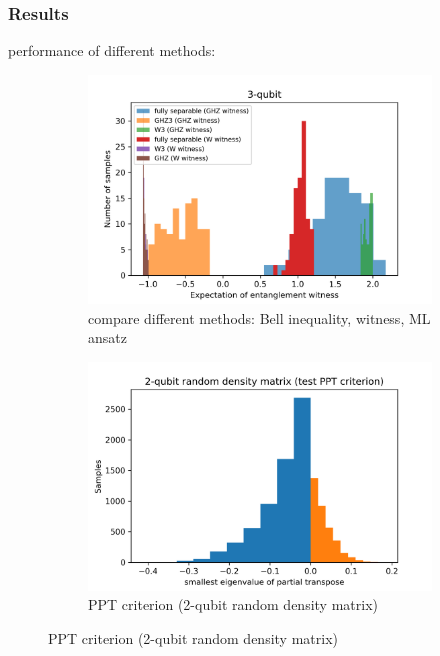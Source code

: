 \documentclass[
10pt,
aps,
pra,
linenumbers,
floatfix,
]{revtex4-2}
\theoremstyle{plain}
\theoremstyle{definition}
\begin{document}
\subsubsection{Results}
performance of different methods: 
\begin{figure}[!ht]
	\centering
	\begin{subfigure}{0.49\textwidth}
	\centering
	\includegraphics[width=.9\linewidth]{./notebook/three_qubit_hist.png}
	\caption{compare different methods: Bell inequality, witness, ML ansatz}
	\end{subfigure}
	\begin{subfigure}{0.49\textwidth}
	\centering
	\includegraphics[width=.9\linewidth]{./notebook/two_qubit_PPT_hist.png}
	\caption{PPT criterion (2-qubit random density matrix)}
	\end{subfigure}
\end{figure}
\end{document}
